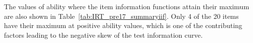 \documentclass[a4paper]{report}
\begin{document}

The values of ability where the item information functions attain their maximum are also shown in Table~\ref{tab:IRT_pre17_summaryiif}. Only 4 of the 20 items have their maximum at positive ability values, which is one of the contributing factors leading to the negative skew of the test information curve. 
\end{document}

